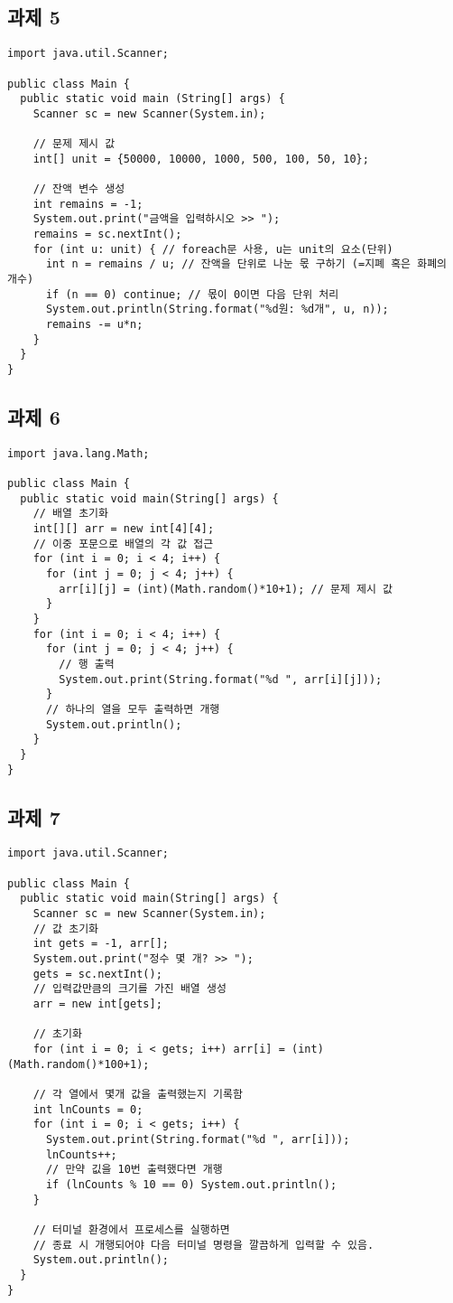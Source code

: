 \documentclass{article}
\begin{document}
\subsection{과제 5}
\begin{lstlisting}
import java.util.Scanner;

public class Main {
  public static void main (String[] args) {
    Scanner sc = new Scanner(System.in);
    
    // 문제 제시 값 
    int[] unit = {50000, 10000, 1000, 500, 100, 50, 10};

    // 잔액 변수 생성
    int remains = -1;
    System.out.print("금액을 입력하시오 >> ");
    remains = sc.nextInt();
    for (int u: unit) { // foreach문 사용, u는 unit의 요소(단위)
      int n = remains / u; // 잔액을 단위로 나눈 몫 구하기 (=지폐 혹은 화폐의 개수)
      if (n == 0) continue; // 몫이 0이면 다음 단위 처리
      System.out.println(String.format("%d원: %d개", u, n));
      remains -= u*n;
    }
  }
}
\end{lstlisting}
\subsection{과제 6}
\begin{lstlisting}
import java.lang.Math;

public class Main {
  public static void main(String[] args) {
    // 배열 초기화
    int[][] arr = new int[4][4];
    // 이중 포문으로 배열의 각 값 접근
    for (int i = 0; i < 4; i++) {
      for (int j = 0; j < 4; j++) {
        arr[i][j] = (int)(Math.random()*10+1); // 문제 제시 값
      }
    }
    for (int i = 0; i < 4; i++) {
      for (int j = 0; j < 4; j++) {
        // 행 출력
        System.out.print(String.format("%d ", arr[i][j]));
      }
      // 하나의 열을 모두 출력하면 개행
      System.out.println();
    }
  }
}
\end{lstlisting}
\subsection{과제 7}
\begin{lstlisting}
import java.util.Scanner;

public class Main {
  public static void main(String[] args) {
    Scanner sc = new Scanner(System.in);
    // 값 초기화
    int gets = -1, arr[];
    System.out.print("정수 몇 개? >> ");
    gets = sc.nextInt();
    // 입력값만큼의 크기를 가진 배열 생성
    arr = new int[gets];
    
    // 초기화
    for (int i = 0; i < gets; i++) arr[i] = (int)(Math.random()*100+1);
    
    // 각 열에서 몇개 값을 출력했는지 기록함
    int lnCounts = 0;
    for (int i = 0; i < gets; i++) {
      System.out.print(String.format("%d ", arr[i]));
      lnCounts++;
      // 만약 깂을 10번 출력했다면 개행
      if (lnCounts % 10 == 0) System.out.println();
    }

    // 터미널 환경에서 프로세스를 실행하면
    // 종료 시 개행되어야 다음 터미널 명령을 깔끔하게 입력할 수 있음.
    System.out.println();
  }
}
\end{lstlisting}
\end{document}

